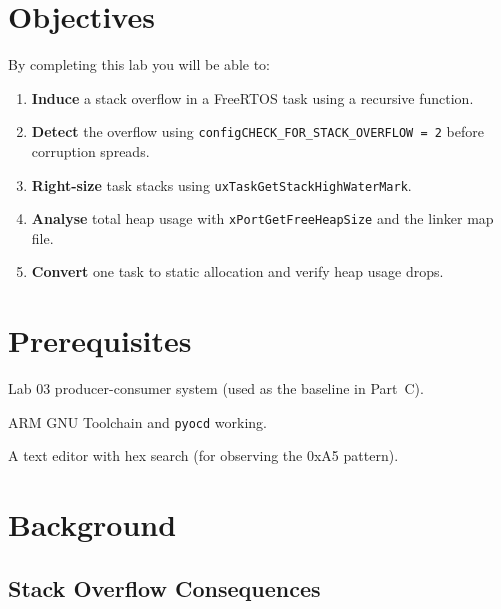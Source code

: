\documentclass[11pt, a4paper]{article}
\begin{document}

\section{Objectives}

By completing this lab you will be able to:

\begin{enumerate}[noitemsep, leftmargin=*]
  \item \textbf{Induce} a stack overflow in a FreeRTOS task using a recursive function.
  \item \textbf{Detect} the overflow using \texttt{configCHECK\_FOR\_STACK\_OVERFLOW = 2}
        before corruption spreads.
  \item \textbf{Right-size} task stacks using \texttt{uxTaskGetStackHighWaterMark}.
  \item \textbf{Analyse} total heap usage with \texttt{xPortGetFreeHeapSize} and the
        linker map file.
  \item \textbf{Convert} one task to static allocation and verify heap usage drops.
\end{enumerate}

\section{Prerequisites}

\begin{checklist}
  \item Lab 03 producer-consumer system (used as the baseline in Part~C).
  \item ARM GNU Toolchain and \texttt{pyocd} working.
  \item A text editor with hex search (for observing the 0xA5 pattern).
\end{checklist}

\section{Background}

\subsection{Stack Overflow Consequences}
\end{document}
